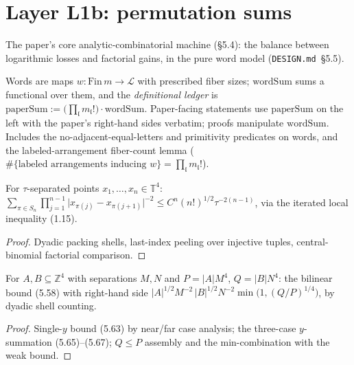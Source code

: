 \chapter{Layer L1b: permutation sums}\label{ch:permsum}

The paper's core analytic-combinatorial machine (\S5.4): the balance
between logarithmic losses and factorial gains, in the pure word model
(\texttt{DESIGN.md}~\S5.5).

\begin{definition}\label{D-ledger}
  \leanok
  Words are maps \(w\colon \mathrm{Fin}\,m \to \mathcal{L}\) with
  prescribed fiber sizes; \(\mathrm{wordSum}\) sums a functional over
  them, and the \emph{definitional ledger} is
  \(\mathrm{paperSum} := \big(\prod_{\mathfrak l} m_{\mathfrak l}!\big)
  \cdot \mathrm{wordSum}\). Paper-facing statements use
  \(\mathrm{paperSum}\) on the left with the paper's right-hand sides
  verbatim; proofs manipulate \(\mathrm{wordSum}\). Includes the
  no-adjacent-equal-letters and primitivity predicates on words, and the
  labeled-arrangement fiber-count lemma
  (\(\#\{\text{labeled arrangements inducing } w\}
  = \prod_{\mathfrak l} m_{\mathfrak l}!\)).
\end{definition}

\begin{lemma}\label{T-toy}
  \leanok
  For \(\tau\)-separated points \(x_1,\dots,x_n \in \mathbb{T}^4\):
  \(\sum_{\pi\in S_n}\prod_{j=1}^{n-1}
  \lvert x_{\pi(j)} - x_{\pi(j+1)}\rvert^{-2}
  \le C^n (n!)^{1/2}\tau^{-2(n-1)}\), via the iterated local inequality
  (1.15).
\end{lemma}
\begin{proof}\leanok
  Dyadic packing shells, last-index peeling over injective tuples,
  central-binomial factorial comparison.
\end{proof}

\begin{lemma}\label{L-5.14}
  \leanok
  For \(A, B \subseteq \mathbb{Z}^4\) with separations \(M, N\) and
  \(P = \lvert A\rvert M^4\), \(Q = \lvert B\rvert N^4\): the bilinear
  bound (5.58) with right-hand side
  \(\lvert A\rvert^{1/2}M^{-2}\,\lvert B\rvert^{1/2}N^{-2}
  \min\big(1, (Q/P)^{1/4}\big)\), by dyadic shell counting.
\end{lemma}
\begin{proof}\leanok
  Single-\(y\) bound (5.63) by near/far case analysis; the three-case
  \(y\)-summation (5.65)--(5.67); \(Q \le P\) assembly and the
  min-combination with the weak bound.
\end{proof}

